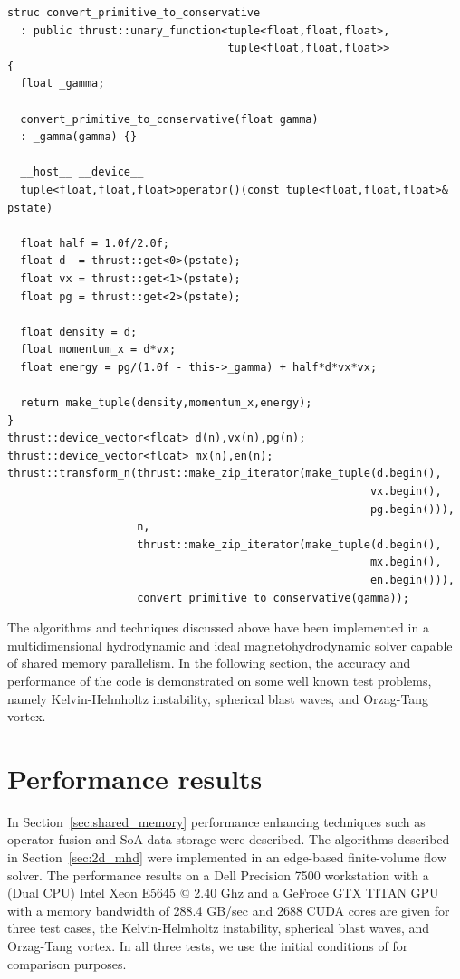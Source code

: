 \begin{lstlisting} 
struc convert_primitive_to_conservative
  : public thrust::unary_function<tuple<float,float,float>,
                                  tuple<float,float,float>>
{
  float _gamma;
  
  convert_primitive_to_conservative(float gamma)
  : _gamma(gamma) {}

  __host__ __device__
  tuple<float,float,float>operator()(const tuple<float,float,float>& pstate)

  float half = 1.0f/2.0f;
  float d  = thrust::get<0>(pstate);
  float vx = thrust::get<1>(pstate);
  float pg = thrust::get<2>(pstate);

  float density = d;
  float momentum_x = d*vx;
  float energy = pg/(1.0f - this->_gamma) + half*d*vx*vx;
  
  return make_tuple(density,momentum_x,energy);
}
thrust::device_vector<float> d(n),vx(n),pg(n); 
thrust::device_vector<float> mx(n),en(n); 
thrust::transform_n(thrust::make_zip_iterator(make_tuple(d.begin(),
                                                        vx.begin(),
                                                        pg.begin())),
                    n,
                    thrust::make_zip_iterator(make_tuple(d.begin(),
                                                        mx.begin(),
                                                        en.begin())),
                    convert_primitive_to_conservative(gamma));
\end{lstlisting} 

The algorithms and techniques discussed above have been implemented in a multidimensional hydrodynamic and ideal magnetohydrodynamic solver capable of shared memory parallelism.  In the following section, the accuracy and performance of the code is demonstrated on some well known test problems, namely Kelvin-Helmholtz instability, spherical blast waves, and Orzag-Tang vortex.  

\section[Performance results]{Performance results}
\label{sec:gpu_results}

In Section~\ref{sec:shared_memory} performance enhancing techniques such as operator fusion and SoA data storage were described.  The algorithms described in Section~\ref{sec:2d_mhd} were implemented in an edge-based finite-volume flow solver.  The performance results on a Dell Precision 7500 workstation with a (Dual CPU) Intel Xeon E5645 @ 2.40 Ghz and a GeFroce GTX TITAN GPU with a memory bandwidth of 288.4 GB/sec and 2688 CUDA cores are given for three test cases, the Kelvin-Helmholtz instability, spherical blast waves, and Orzag-Tang vortex.  In all three tests, we use the initial conditions of \citep{url:athena} for comparison purposes.

